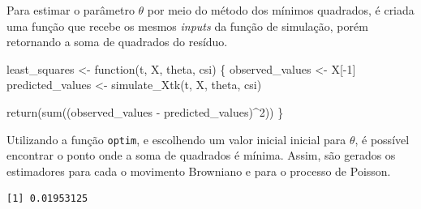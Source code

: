 \documentclass[
  letterpaper,
  DIV=11,
  numbers=noendperiod]{scrreprt}
\newenvironment{Shaded}{\begin{snugshade}}{\end{snugshade}}
\newcommand{\AttributeTok}[1]{\textcolor[rgb]{0.40,0.45,0.13}{#1}}
\newcommand{\ControlFlowTok}[1]{\textcolor[rgb]{0.00,0.23,0.31}{#1}}
\newcommand{\DecValTok}[1]{\textcolor[rgb]{0.68,0.00,0.00}{#1}}
\newcommand{\DocumentationTok}[1]{\textcolor[rgb]{0.37,0.37,0.37}{\textit{#1}}}
\newcommand{\FunctionTok}[1]{\textcolor[rgb]{0.28,0.35,0.67}{#1}}
\newcommand{\NormalTok}[1]{\textcolor[rgb]{0.00,0.23,0.31}{#1}}
\newcommand{\OtherTok}[1]{\textcolor[rgb]{0.00,0.23,0.31}{#1}}
\newcommand{\SpecialCharTok}[1]{\textcolor[rgb]{0.37,0.37,0.37}{#1}}
\begin{document}
Para estimar o parâmetro \(\theta\) por meio do método dos mínimos
quadrados, é criada uma função que recebe os mesmos \emph{inputs} da
função de simulação, porém retornando a soma de quadrados do resíduo.

\begin{Shaded}
\begin{Highlighting}[]
\NormalTok{least\_squares }\OtherTok{\textless{}{-}} \ControlFlowTok{function}\NormalTok{(t, X, theta, csi) \{}
\NormalTok{    observed\_values }\OtherTok{\textless{}{-}}\NormalTok{ X[}\SpecialCharTok{{-}}\DecValTok{1}\NormalTok{]}
\NormalTok{    predicted\_values }\OtherTok{\textless{}{-}} \FunctionTok{simulate\_Xtk}\NormalTok{(t, X, theta, csi)}

    \FunctionTok{return}\NormalTok{(}\FunctionTok{sum}\NormalTok{((observed\_values }\SpecialCharTok{{-}}\NormalTok{ predicted\_values)}\SpecialCharTok{\^{}}\DecValTok{2}\NormalTok{))}
\NormalTok{\}}
\end{Highlighting}
\end{Shaded}

Utilizando a função \texttt{optim}, e escolhendo um valor inicial
inicial para \(\theta\), é possível encontrar o ponto onde a soma de
quadrados é mínima. Assim, são gerados os estimadores para cada o
movimento Browniano e para o processo de Poisson.

\begin{Shaded}
\end{Shaded}

\begin{verbatim}
[1] 0.01953125
\end{verbatim}

\begin{Shaded}
\end{Shaded}
\end{document}
